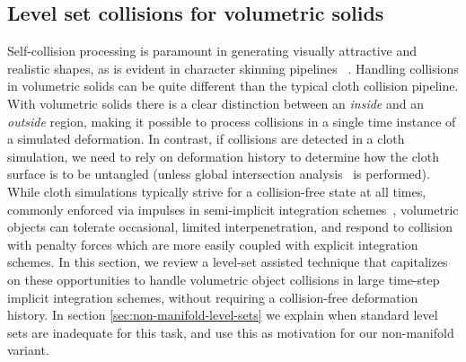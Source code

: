 \subsection{Level set collisions for volumetric solids}
\label{sec:self-collisions}


Self-collision processing is paramount in generating visually attractive and
realistic shapes, as is evident in character skinning pipelines
~\citep{McAdaZSETTS:2011,VaillBGCRWGP:2013}. Handling collisions in
volumetric solids can be quite different than the typical cloth
collision pipeline. With volumetric solids there is a clear
distinction between an \emph{inside} and an \emph{outside} region,
making it possible to process collisions in a single time instance of
a simulated deformation. In contrast, if collisions are detected in a
cloth simulation, we need to rely on deformation history to determine
how the cloth surface is to be untangled (unless global intersection
analysis~\citep{BarafWK:2003} is performed). While cloth simulations
typically strive for a collision-free state at all times, commonly
enforced via impulses in semi-implicit integration
schemes~\citep{BridsMF:2003}, volumetric objects can tolerate
occasional, limited interpenetration, and respond to collision with
penalty forces which are more easily coupled with explicit integration
schemes. In this section, we review a level-set assisted technique
that capitalizes on these opportunities to handle volumetric object
collisions in large time-step implicit integration schemes, without
requiring a collision-free deformation history.  In section
\ref{sec:non-manifold-level-sets} we explain when standard level sets
are inadequate for this task, and use this as motivation for our
non-manifold variant.


